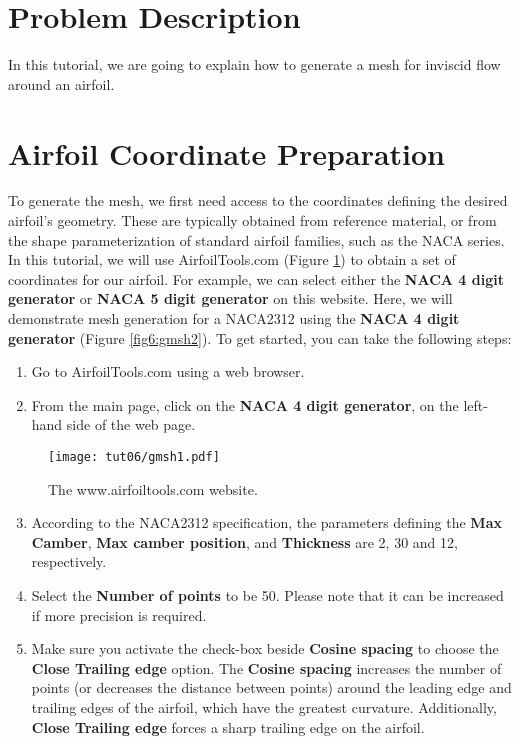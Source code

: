 \section{Problem Description}
In this tutorial, we are going to explain how to generate a mesh for inviscid flow around an airfoil.
\section{Airfoil Coordinate Preparation}
To generate the mesh, we first need access to the coordinates defining the desired airfoil's geometry. These are typically obtained from reference material, or from the shape parameterization of standard airfoil families, such as the NACA series. In this tutorial, we will use AirfoilTools.com (Figure \ref{fig6:gmsh1}) to obtain a set of coordinates for our airfoil. For example, we can select either the \textbf{NACA 4 digit generator} or \textbf{NACA 5 digit generator} on this website. Here, we will demonstrate mesh generation for a NACA2312 using the \textbf{NACA 4 digit generator} (Figure \ref{fig6:gmsh2}).
To get started, you can take the following steps:
\begin{enumerate}[label=\arabic*)]
	\setcounter{enumi}{0}
	\item Go to AirfoilTools.com using a web browser.
	\item From the main page, click on the \textbf{NACA 4 digit generator}, on the left-hand side of the web page.
\end{enumerate}
\begin{figure}[H]
	\centering
	\texttt{[image: tut06/gmsh1.pdf]}
	\caption{The www.airfoiltools.com website.}
	\label{fig6:gmsh1}
\end{figure}
\begin{enumerate}[label=\arabic*)]
	\setcounter{enumi}{2}
	\item According to the NACA2312 specification, the parameters defining the \textbf{Max Camber}, \textbf{Max camber position}, and \textbf{Thickness} are 2, 30 and 12, respectively.
	\item Select the \textbf{Number of points} to be 50. Please note that it can be increased if more precision is required.
	\item Make sure you activate the check-box beside \textbf{Cosine spacing} to choose the \textbf{Close Trailing edge} option. The \textbf{Cosine spacing} increases the number of points (or decreases the distance between points) around the leading edge and trailing edges of the airfoil, which have the greatest curvature. Additionally, \textbf{Close Trailing edge} forces a sharp trailing edge on the airfoil.
\end{enumerate}
